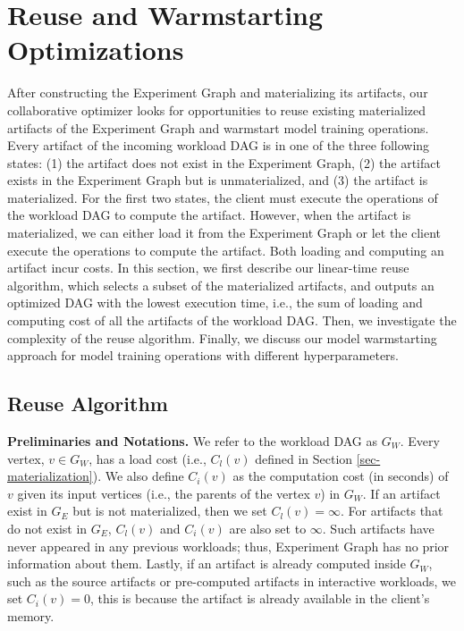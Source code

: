 \section{Reuse and Warmstarting Optimizations}\label{sec-reuse-and-warmstarting}
After constructing the Experiment Graph and materializing its artifacts, our collaborative optimizer looks for opportunities to reuse existing materialized artifacts of the Experiment Graph and warmstart model training operations.
Every artifact of the incoming workload DAG is in one of the three following states: (1) the artifact does not exist in the Experiment Graph, (2) the artifact exists in the Experiment Graph but is unmaterialized, and (3) the artifact is materialized.
For the first two states, the client must execute the operations of the workload DAG to compute the artifact.
However, when the artifact is materialized, we can either load it from the Experiment Graph or let the client execute the operations to compute the artifact.
Both loading and computing an artifact incur costs.
In this section, we first describe our linear-time reuse algorithm, which selects a subset of the materialized artifacts, and outputs an optimized DAG with the lowest execution time, i.e., the sum of loading and computing cost of all the artifacts of the workload DAG.
Then, we investigate the complexity of the reuse algorithm.
Finally, we discuss our model warmstarting approach for model training operations with different hyperparameters.
\subsection{Reuse Algorithm} 
\textbf{Preliminaries and Notations.} 
We refer to the workload DAG as $G_W$.
Every vertex, $v \in G_W$, has a load cost (i.e., $C_l(v)$ defined in Section \ref{sec-materialization}).
We also define $C_i(v)$ as the computation cost (in seconds) of $v$ given its input vertices (i.e., the parents of the vertex $v$) in $G_W$.
If an artifact exist in $G_E$ but is not materialized, then we set $C_l(v)=\infty$.
For artifacts that do not exist in $G_E$, $C_l(v)$ and $C_i(v)$ are also set to $\infty$.
Such artifacts have never appeared in any previous workloads; thus, Experiment Graph has no prior information about them.
Lastly, if an artifact is already computed inside $G_W$, such as the source artifacts or pre-computed artifacts in interactive workloads, we set $C_i(v)=0$, this is because the artifact is already available in the client's memory.

